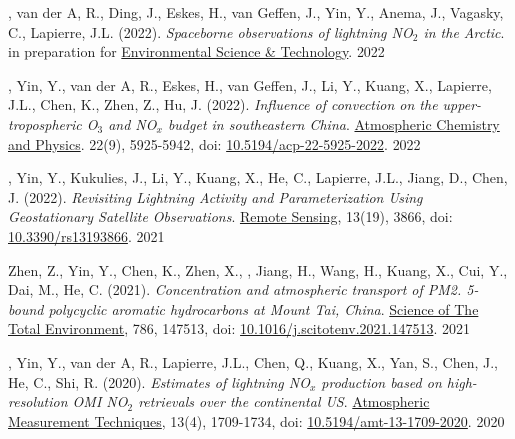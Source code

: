

\begin{cvpublications}

\publication
{, van der A, R., Ding, J., Eskes, H., van Geffen, J.,
Yin, Y., Anema, J., Vagasky, C., Lapierre, J.L. (2022).
\emph{Spaceborne observations of lightning NO$_2$ in the Arctic}.
in preparation for \underline{Environmental Science \& Technology}.} %
{2022} %

\publication
{, Yin, Y., van der A, R., Eskes, H., van Geffen, J.,
Li, Y., Kuang, X., Lapierre, J.L., Chen, K., Zhen, Z., Hu, J. (2022).
\emph{Influence of convection on the upper-tropospheric O$_3$ and NO$_x$ budget in southeastern China}.
\underline{Atmospheric Chemistry and Physics}.
22(9), 5925-5942, doi: \href{https://doi.org/10.5194/acp-22-5925-2022}{10.5194/acp-22-5925-2022}.} %
{2022} %

\publication
{, Yin, Y., Kukulies, J., Li, Y., Kuang, X.,
He, C., Lapierre, J.L., Jiang, D., Chen, J. (2022).
\emph{Revisiting Lightning Activity and Parameterization Using
Geostationary Satellite Observations}.
\underline{Remote Sensing}, 13(19), 3866,
doi: \href{https://doi.org/10.3390/rs13193866}{10.3390/rs13193866}.} %
{2021} %

\publication
{Zhen, Z., Yin, Y., Chen, K., Zhen, X., ,
Jiang, H., Wang, H., Kuang, X., Cui, Y., Dai, M., He, C. (2021).
\emph{Concentration and atmospheric transport of PM2. 5-bound polycyclic aromatic hydrocarbons at Mount Tai, China}.
\underline{Science of The Total Environment}, 786, 147513,
doi: \href{https://doi.org/10.1016/j.scitotenv.2021.147513}{10.1016/j.scitotenv.2021.147513}.} %
{2021} %

\publication
{, Yin, Y., van der A, R., Lapierre, J.L.,
Chen, Q., Kuang, X., Yan, S., Chen, J., He, C., Shi, R. (2020).
\emph{Estimates of lightning NO$_x$ production based on high-resolution OMI NO$_2$ retrievals over the continental US}.
\underline{Atmospheric Measurement Techniques}, 13(4), 1709-1734,
doi: \href{https://doi.org/10.5194/amt-13-1709-2020}{10.5194/amt-13-1709-2020}.} %
{2020} %


\end{cvpublications}
